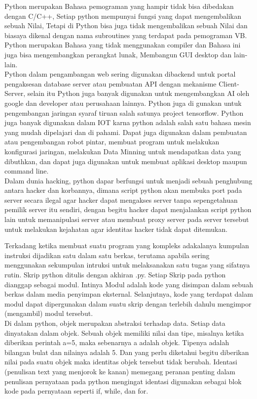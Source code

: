 \documentclass[12pt,a4paper]{article}
\begin{document}
Python merupakan Bahasa pemograman yang hampir tidak bisa dibedakan dengan C/C++, Setiap python mempunyai fungsi yang dapat mengembalikan sebuah Nilai, Tetapi di Python  bisa juga  tidak mengembalikan sebuah Nilai dan biasaya dikenal dengan nama subroutines yang terdapat pada pemograman VB. Python merupakan Bahasa yang tidak menggunakan compiler dan Bahasa ini juga bisa mengembangkan perangkat lunak, Membangun GUI desktop dan lain-lain.\\

Python dalam pengambangan web sering digunakan dibackend untuk portal pengaksesan database server atau pembuatan API dengan mekanisme Client-Server, selain itu Python juga banyak digunakan untuk mengembangkan AI oleh google dan developer atau perusahaan lainnya. Python juga di gunakan untuk pengembangan jaringan syaraf tiruan salah satunya project tensorflow. Python juga banyak digunakan dalam IOT karna python adalah salah satu bahasa mesin yang mudah dipelajari dan di pahami. Dapat juga digunakan dalam pembuatan atau pengembangan robot pintar, membuat program untuk melakukan konfigurasi jaringan, melakukan Data Minning untuk mendapatkan data yang dibuthkan, dan dapat juga digunakan untuk membuat aplikasi desktop maupun command line.\\

Dalam dunia hacking, python dapar berfungsi untuk menjadi sebuah penghubung antara hacker dan korbannya, dimana script python akan membuka port pada server secara ilegal agar hacker dapat mengakses server tanpa sepengetahuan pemilik server itu sendiri, dengan begitu hacker dapat menjalankan script python lain untuk memanipulasi server atau membuat proxy server pada server tersebut untuk melakukan kejahatan agar identitas hacker tidak dapat ditemukan.

Terkadang ketika membuat suatu program yang kompleks adakalanya kumpulan instruksi dijadikan satu dalam satu berkas, terutama apabila sering menggunakan sekumpulan intruksi untuk melaksanakan satu tugas yang sifatnya rutin. Skrip python ditulis dengan akhiran .py. Setiap Skrip pada python dianggap sebagai modul. Intinya Modul adalah kode yang disimpan dalam sebuah berkas dalam media penyimpan eksternal. Selanjutnya, kode yang terdapat dalam modul dapat dipergunakan dalam suatu skrip dengan terlebih dahulu mengimpor (mengambil) modul tersebut.\\

Di dalam python, objek merupakan abstraksi terhadap data. Setiap data dinyatakan dalam objek. Sebuah objek memiliki nilai dan tipe, misalnya ketika diberikan perintah a=5, maka sebenarnya a adalah objek. Tipenya adalah bilangan bulat dan nilainya adalah 5. Dan yang perlu diketahui begitu diberikan nilai pada suatu objek maka identitas objek tersebut tidak berubah. Identasi (penulisan text yang menjorok ke kanan) memegang peranan penting dalam penulisan pernyataan pada python mengingat identasi digunakan sebagai blok kode pada pernyataan seperti if, while, dan for.\\
\end{document}
